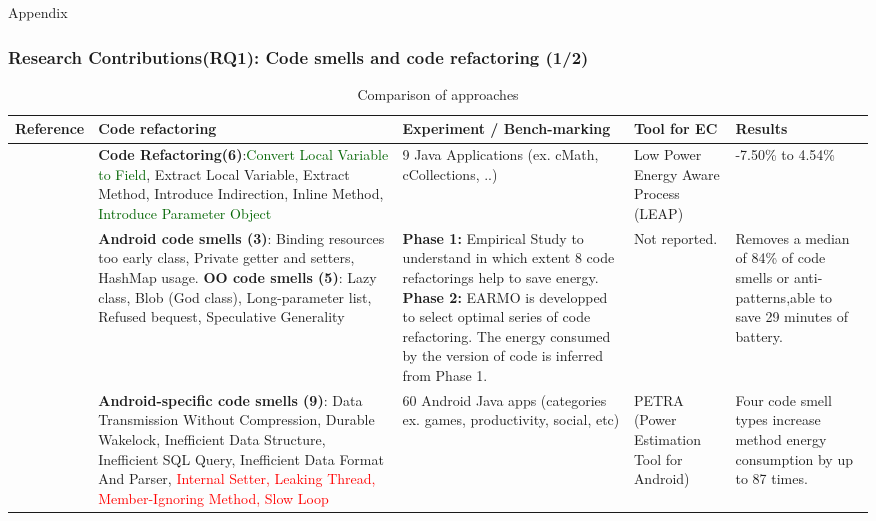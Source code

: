 \documentclass{beamer}
\begin{document}
\begin{frame}{Appendix}
\hypertarget{Research Contributions_1}{}
  \frametitle{Research Contributions(RQ1): Code smells and code refactoring (1/2)}
\vspace{-.4cm}
\tiny
\begin{table}[!t]
\centering
\caption{Comparison of approaches}\label{tab:result}
\vspace{-.4cm}
\begin{tabular}{|p{1.5cm}|p{3cm}|p{2.5cm}|p{2cm}|p{1cm}|}

\hline
\textbf{Reference} & \textbf{Code refactoring} & \textbf{Experiment / Bench-marking} & \textbf{Tool for EC} & \textbf{Results}  \\

\hline
\cite{sahin2014code} & 
\textbf{Code Refactoring(6)}:\textcolor{darkgreen}{Convert Local Variable to Field},
Extract Local Variable,
Extract Method,
Introduce Indirection, 
Inline Method,
\textcolor{darkgreen}{Introduce Parameter Object} & 
9 Java Applications (ex. cMath, cCollections, ..) & 
Low Power Energy Aware Process (LEAP) & 
-7.50\% to 4.54\%  \\
\hline

\cite{morales2018earmo} & 
\textbf{Android code smells (3)}: Binding resources too early class, Private getter and setters, HashMap usage. \textbf{OO code smells (5)}: Lazy class, Blob (God class), Long-parameter list, Refused bequest, Speculative Generality & 
\textbf{Phase 1:} Empirical Study to understand in which extent 8 code refactorings help to save energy. 
\textbf{Phase 2:} EARMO is developped to select optimal series of code refactoring.  The energy consumed by the version of code is inferred from Phase 1. & 
Not reported. &
Removes a median of 84\% of code smells or anti-patterns,able to save 29 minutes of battery.
\\
\hline

\cite{palomba2019impact} & 
\textbf{Android-specific code smells (9)}: Data Transmission Without Compression, Durable Wakelock, Inefficient Data Structure, Inefficient SQL Query, Inefficient Data Format And Parser, \textcolor{red}{Internal Setter, Leaking Thread,  Member-Ignoring Method, Slow Loop} & 
60 Android Java apps (categories ex. games, productivity, social, etc) & 
PETRA (Power Estimation Tool for Android) & 
Four code smell types increase method energy consumption by up to 87 times.
\\
\hline

\end{tabular}
\end{table}

\end{frame}
\end{document}
